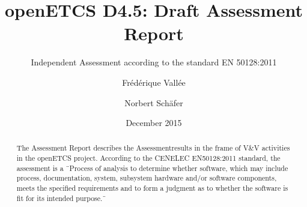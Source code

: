 \documentclass[openetcs]{template/openetcs_article}
\begin{document}
\frontmatter
{}




\title{openETCS D4.5: Draft Assessment Report}

\subtitle{Independent Assessment according to the standard EN 50128:2011}

\date{December 2015}







\author{Fr\'ed\'erique Vall\'ee}


\author{Norbert Sch\"afer}









\begin{abstract}
The Assessment Report describes the Assessmentresults in the frame of V\&V activities in the openETCS \cite{openETCS} project.
According to the CENELEC EN50128:2011 \cite{EN50128} standard, the assessment is a \"\ Process of analysis to determine whether software, which may include
process, documentation, system, subsystem hardware and/or software components, meets the specified requirements and to form a judgment as to whether the
software is fit for its intended purpose.\"\
\\
\end{abstract}
\end{document}
